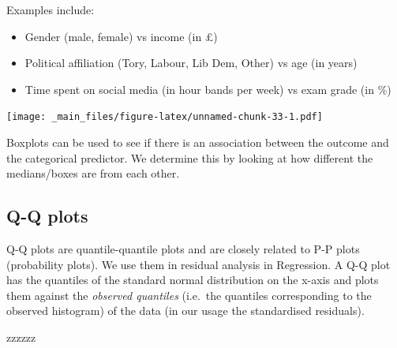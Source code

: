 \documentclass[
]{gitbook}
\providecommand{\tightlist}{%
  \setlength{\itemsep}{0pt}\setlength{\parskip}{0pt}}
\begin{document}
Examples include:

\begin{itemize}
\tightlist
\item
  Gender (male, female) vs income (in £)
\item
  Political affiliation (Tory, Labour, Lib Dem, Other) vs age (in years)
\item
  Time spent on social media (in hour bands per week) vs exam grade (in \%)
\end{itemize}

\texttt{[image: \_main\_files/figure-latex/unnamed-chunk-33-1.pdf]}

Boxplots can be used to see if there is an association between the outcome and the categorical predictor. We determine this by looking at how different the medians/boxes are from each other.


\newpage

\hypertarget{q-q-plots}{%
\subsection{Q-Q plots}\label{q-q-plots}}

Q-Q plots are quantile-quantile plots and are closely related to P-P plots (probability plots). We use them in residual analysis in Regression. A Q-Q plot has the quantiles of the standard normal distribution on the x-axis and plots them against the \emph{observed quantiles} (i.e.~the quantiles corresponding to the observed histogram) of the data (in our usage the standardised residuals).

\color{white} zzzzzz \color{black} 
\end{document}
